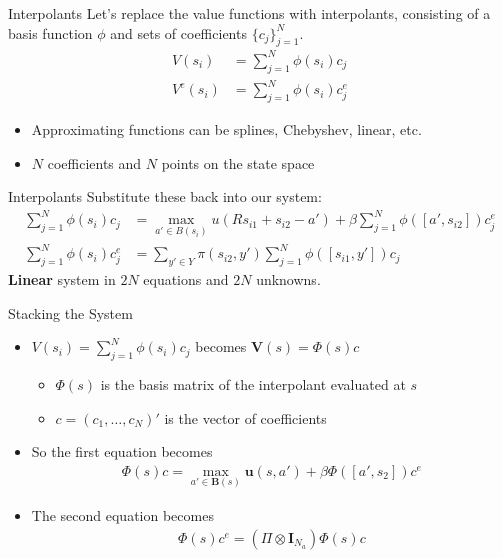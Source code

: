 \documentclass{beamer}
\begin{document}
\begin{frame}{Interpolants}
Let's replace the value functions with interpolants, consisting of a basis function $\phi$ and sets of coefficients $\{c_j \}_{j=1}^N$.
\begin{align*}
V(s_i) &= \displaystyle \sum_{j=1}^{N} \phi(s_i) c_j \\
V^e(s_i) &= \displaystyle \sum_{j=1}^{N} \phi(s_i) c_j^e
\end{align*}
\begin{itemize}
\item Approximating functions can be splines, Chebyshev, linear, etc.
\item $N$ coefficients and $N$ points on the state space
\end{itemize}
\end{frame}

\begin{frame}{Interpolants}
Substitute these back into our system:
\begin{align*}
    \displaystyle \sum_{j=1}^{N} \phi(s_i) c_j &= \max_{a' \in B(s_i)} u(Rs_{i1} + s_{i2} - a') + \beta \displaystyle \sum_{j=1}^{N} \phi([a', s_{i2}]) c_j^e \\
    \displaystyle \sum_{j=1}^{N} \phi(s_i) c_j^e &= \displaystyle \sum_{y' \in Y} \pi(s_{i2}, y') \displaystyle \sum_{j=1}^{N} \phi([s_{i1}, y']) c_j
\end{align*}
\textbf{Linear} system in $2N$ equations and $2N$ unknowns.
\end{frame}

\begin{frame}{Stacking the System}
\begin{itemize}
\item $V(s_i) = \displaystyle \sum_{j=1}^{N} \phi(s_i) c_j$ becomes $\mathbf{V}(s) = \Phi(s)c$
\begin{itemize}
\item $\Phi(s)$ is the basis matrix of the interpolant evaluated at $s$
\item $c = (c_1, \hdots, c_N)'$ is the vector of coefficients
\end{itemize}
\item So the first equation becomes
\begin{align*}
\Phi(s)c = \max_{a' \in \mathbf{B}(s)} \mathbf{u}(s, a') + \beta \Phi([a', s_2]) c^e
\end{align*}
\item The second equation becomes
\begin{align*}
\Phi(s)c^e = (\Pi \otimes \mathbf{I}_{N_a}) \Phi (s) c
\end{align*}
\end{itemize}
\end{frame}
\end{document}
